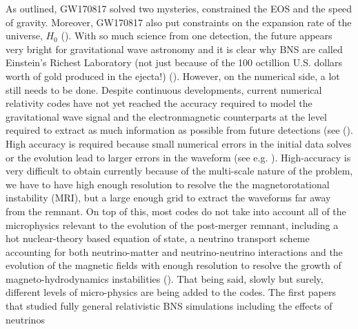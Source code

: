 As outlined, GW170817 solved two mysteries, constrained the EOS and the speed of gravity. Moreover, GW170817 also put constraints on the expansion rate of the universe, $H_0$ (\citet*{ligo2017gravitational}). With so much science from one detection, the future appears very bright for gravitational wave astronomy and it is clear why BNS are called Einstein's Richest Laboratory (not just because of the 100 octillion U.S. dollars worth of gold produced in the ejecta!) (\citet*{baiotti2016binary}). However, on the numerical side, a lot still needs to be done. Despite continuous developments, current numerical relativity codes have not yet reached the accuracy required to model the gravitational wave signal and the electronmagnetic counterparts at the level required to extract as much information as possible from future detections (see (\citet*{baiotti2016binary}). High accuracy is required because small numerical errors in the initial data solves or the evolution lead to larger errors in the waveform (see e.g. \citet*{tsokaros2016initialfixed}). High-accuracy is very difficult to obtain currently because of the multi-scale nature of the problem, we have to have high enough resolution to resolve the the magnetorotational instability (MRI), but a large enough grid to extract the waveforms far away from the remnant. On top of this, most codes do not take into account all of the microphysics relevant to the evolution of the post-merger remnant, including a hot nuclear-theory based equation of state, a neutrino transport scheme accounting for both neutrino-matter and neutrino-neutrino interactions and the evolution of the magnetic fields with enough resolution to resolve the growth of magneto-hydrodynamics instabilities (\citet*{foucart2015low}). That being said, slowly but surely, different levels of micro-physics are being added to the codes. The first papers that studied fully general relativistic BNS simulations including the effects of neutrinos
